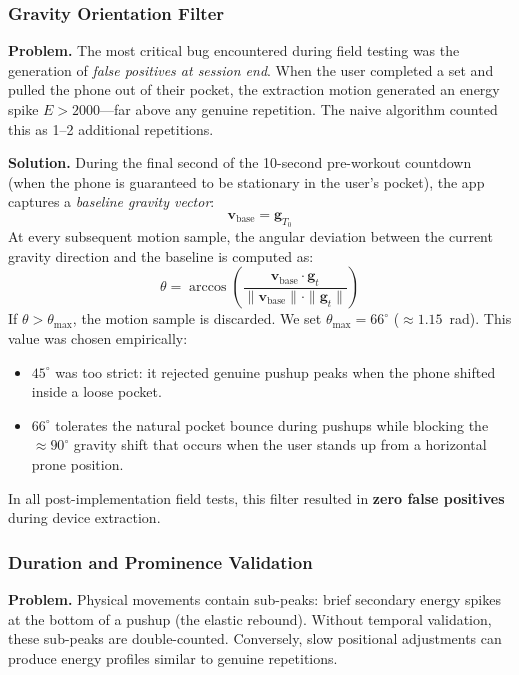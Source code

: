 \documentclass[11pt]{article}
\begin{document}
\subsubsection{Gravity Orientation Filter}
\label{sec:gravity}

\textbf{Problem.} The most critical bug encountered during field testing was the generation of \textit{false positives at session end}. When the user completed a set and pulled the phone out of their pocket, the extraction motion generated an energy spike $E > 2000$—far above any genuine repetition. The naive algorithm counted this as 1--2 additional repetitions.

\textbf{Solution.} During the final second of the 10-second pre-workout countdown (when the phone is guaranteed to be stationary in the user's pocket), the app captures a \textit{baseline gravity vector}:
\begin{equation}
  \mathbf{v}_{\text{base}} = \mathbf{g}_{T_0}
  \label{eq:base_gravity}
\end{equation}
At every subsequent motion sample, the angular deviation between the current gravity direction and the baseline is computed as:
\begin{equation}
  \theta = \arccos\!\left( \frac{\mathbf{v}_{\text{base}} \cdot \mathbf{g}_t}{\|\mathbf{v}_{\text{base}}\| \cdot \|\mathbf{g}_t\|} \right)
  \label{eq:gravity_angle}
\end{equation}
If $\theta > \theta_{\text{max}}$, the motion sample is discarded. We set $\theta_{\text{max}} = 66^{\circ}$ ($\approx 1.15$~rad). This value was chosen empirically:
\begin{itemize}
  \item $45^{\circ}$ was too strict: it rejected genuine pushup peaks when the phone shifted inside a loose pocket.
  \item $66^{\circ}$ tolerates the natural pocket bounce during pushups while blocking the $\approx 90^{\circ}$ gravity shift that occurs when the user stands up from a horizontal prone position.
\end{itemize}
In all post-implementation field tests, this filter resulted in \textbf{zero false positives} during device extraction.

\subsubsection{Duration and Prominence Validation}
\label{sec:cooldown}

\textbf{Problem.} Physical movements contain sub-peaks: brief secondary energy spikes at the bottom of a pushup (the elastic rebound). Without temporal validation, these sub-peaks are double-counted. Conversely, slow positional adjustments can produce energy profiles similar to genuine repetitions.
\end{document}
